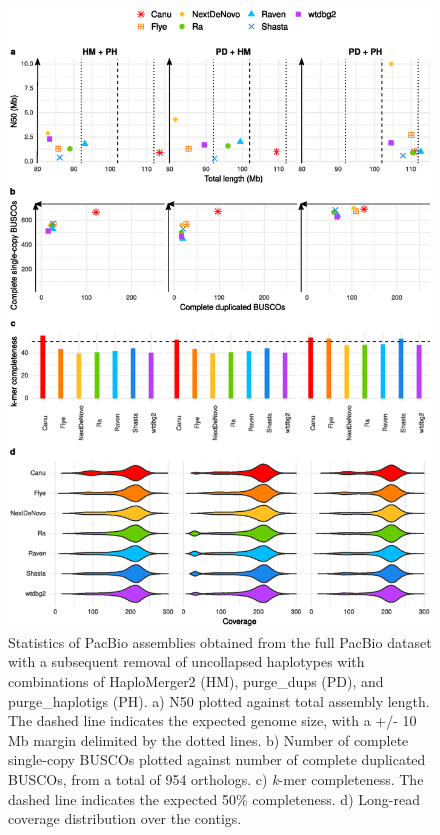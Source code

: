 \begin{suppsection}
   \begin{figure}[ht]
    \centering
     \includegraphics[width=13.5cm]{fig/benchmark/supp_pacbio_purging_combinations_v20200919.eps}
   \caption{Statistics of PacBio assemblies obtained from the full PacBio dataset with a subsequent removal of uncollapsed haplotypes with combinations of HaploMerger2 (HM), purge\_dups (PD), and purge\_haplotigs (PH). a) N50 plotted against total assembly length. The dashed line indicates the expected genome size, with a +/- 10 Mb margin delimited by the dotted lines. b) Number of complete single-copy BUSCOs plotted against number of complete duplicated BUSCOs, from a total of 954 orthologs. c) \textit{k}-mer completeness. The dashed line indicates the expected 50\% completeness. d) Long-read coverage distribution over the contigs.}
   \label{fig:pacbio_purging_combinations}
 \end{figure}
 

\end{suppsection}
